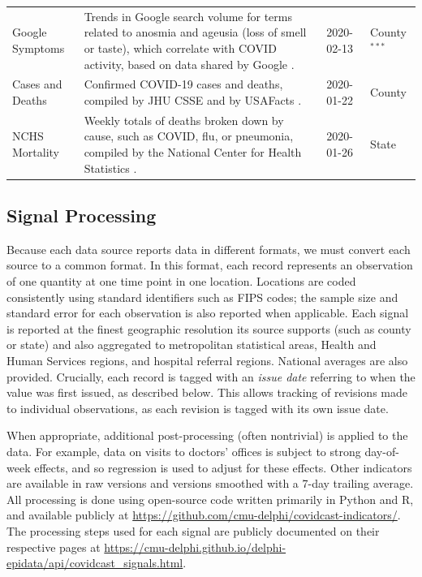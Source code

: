 \documentclass[9pt,twocolumn,twoside,lineno]{pnas-new}
\begin{document}
\begin{table}[t]
\begin{tabular}{>{\raggedright}p{1.2in} p{4.0in} l >{\raggedright\arraybackslash}p{0.5in}}
  Google Symptoms & Trends in Google search volume for terms related to
anosmia and ageusia (loss of smell or taste), which correlate with COVID
activity, based on data shared by Google \cite{GoogleSymptoms}. & 2020-02-13 &
County$^{***}$ \\
  Cases and Deaths & Confirmed COVID-19 cases and deaths, compiled by JHU CSSE
\cite{Dong:2020} and by USAFacts \cite{USAFacts}. & 2020-01-22 & County \\
    NCHS Mortality & Weekly totals of deaths broken down by cause, such as
COVID, flu, or pneumonia, compiled by the National Center for Health Statistics
\cite{NCHS}. & 2020-01-26 & State \\
  \bottomrule
\end{tabular}
\label{tab:sources_signals}
\end{table}

\subsection{Signal Processing}

Because each data source reports data in different formats, we must convert each
source to a common format. In this format, each record represents an observation
of one quantity at one time point in one location. Locations are coded
consistently using standard identifiers such as FIPS codes; the sample size and
standard error for each observation is also reported when applicable. Each
signal is reported at the finest geographic resolution its source supports (such
as county or state) and also aggregated to metropolitan statistical areas,
Health and Human Services regions, and hospital referral regions. National
averages are also provided. Crucially, each record is tagged with an
\textit{issue date} referring to when the value was first issued, as described
below. This allows tracking of revisions made to individual observations, as
each revision is tagged with its own issue date.

When appropriate, additional post-processing (often nontrivial) is applied to
the data. For example, data on visits to doctors' offices is subject to strong
day-of-week effects, and so regression is used to adjust for these effects.
Other indicators are available in raw versions and versions smoothed with a
7-day trailing average. All processing is done using open-source code written
primarily in Python and R, and available publicly at
\url{https://github.com/cmu-delphi/covidcast-indicators/}. The processing steps
used for each signal are publicly documented on their respective pages at
\url{https://cmu-delphi.github.io/delphi-epidata/api/covidcast_signals.html}.
\end{document}
